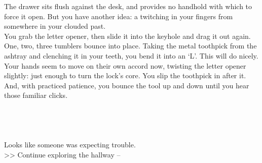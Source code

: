 The drawer sits flush against the desk, and provides no handhold with which to force it open. But you have another idea: a twitching in your fingers from somewhere in your clouded past.\\

You grab the letter opener, then slide it into the keyhole and drag it out again. One, two, three tumblers bounce into place. Taking the metal toothpick from the ashtray and clenching it in your teeth, you bend it into an ‘L’. This will do nicely.\\

Your hands seem to move on their own accord now, twisting the letter opener slightly: just enough to turn the lock's core. You slip the toothpick in after it. And, with practiced patience, you bounce the tool up and down until you hear those familiar clicks.\\
\\
\\
\\
\\

Looks like someone was expecting trouble.\\

>> Continue exploring the hallway -- 